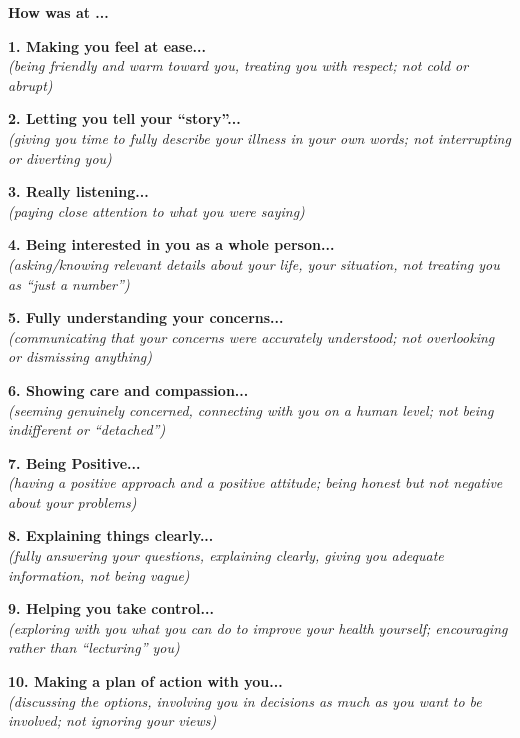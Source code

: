\begin{small}

	\begin{tcolorbox}[boxrule=1pt]
		\begin{center}
			{\large \textbf{How was \sysname at ...}}
		\end{center}

	\end{tcolorbox}

	\vspace{1em}


	\noindent \textbf{1. Making you feel at ease...} \\
	\textit{(being friendly and warm toward you, treating you with respect; not cold or abrupt)}
	\ratingTable

	\noindent \textbf{2. Letting you tell your ``story''...} \\
	\textit{(giving you time to fully describe your illness in your own words; not interrupting or diverting you)}
	\ratingTable

	\noindent \textbf{3. Really listening...} \\
	\textit{(paying close attention to what you were saying)}
	\ratingTable

	\noindent \textbf{4. Being interested in you as a whole person...} \\
	\textit{(asking/knowing relevant details about your life, your situation, not treating you as ``just a number'')}
	\ratingTable


	\noindent \textbf{5. Fully understanding your concerns...} \\
	\textit{(communicating that your concerns were accurately understood; not overlooking or dismissing anything)}
	\ratingTable

	\noindent \textbf{6. Showing care and compassion...} \\
	\textit{(seeming genuinely concerned, connecting with you on a human level; not being indifferent or ``detached'')}
	\ratingTable

	\noindent \textbf{7. Being Positive...} \\
	\textit{(having a positive approach and a positive attitude; being honest but not negative about your problems)}
	\ratingTable

	\noindent \textbf{8. Explaining things clearly...} \\
	\textit{(fully answering your questions, explaining clearly, giving you adequate information, not being vague)}
	\ratingTable

	\noindent \textbf{9. Helping you take control...} \\
        \textit{(exploring with you what you can do to improve your health yourself; encouraging rather than ``lecturing'' you)}
	\ratingTable

	\noindent \textbf{10. Making a plan of action with you...} \\
	\textit{(discussing the options, involving you in decisions as much as you want to be involved; not ignoring your views)}
	\ratingTable
\end{small}

